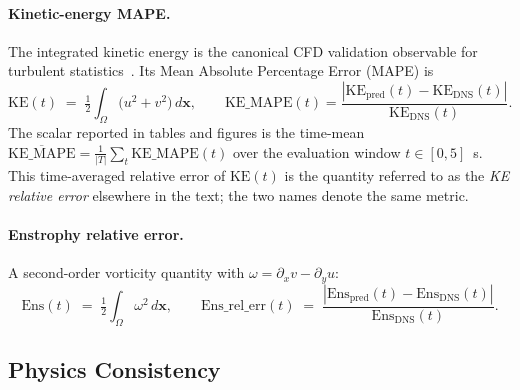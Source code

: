 \paragraph{Kinetic-energy MAPE.}
The integrated kinetic energy is the canonical CFD validation observable for turbulent statistics~\cite{Pope2000}. Its Mean Absolute Percentage Error (MAPE) is
\begin{equation}
    \mathrm{KE}(t) \;=\; \tfrac{1}{2}\int_\Omega \big(u^2 + v^2\big)\,d\mathbf{x},\qquad
    \mathrm{KE\_MAPE}(t) = \frac{|\mathrm{KE}_{\text{pred}}(t) - \mathrm{KE}_{\text{DNS}}(t)|}{\mathrm{KE}_{\text{DNS}}(t)}.
\end{equation}
The scalar reported in tables and figures is the time-mean $\overline{\mathrm{KE\_MAPE}} = \tfrac{1}{|T|}\sum_t \mathrm{KE\_MAPE}(t)$ over the evaluation window $t\in[0,5]$~s. This time-averaged relative error of $\mathrm{KE}(t)$ is the quantity referred to as the \emph{KE relative error} elsewhere in the text; the two names denote the same metric.

\paragraph{Enstrophy relative error.}
A second-order vorticity quantity with $\omega = \partial_x v - \partial_y u$:
\begin{equation}
    \mathrm{Ens}(t) \;=\; \tfrac{1}{2}\int_\Omega \omega^2\,d\mathbf{x},\qquad
    \mathrm{Ens\_rel\_err}(t) \;=\; \frac{|\mathrm{Ens}_{\text{pred}}(t) - \mathrm{Ens}_{\text{DNS}}(t)|}{\mathrm{Ens}_{\text{DNS}}(t)}.
\end{equation}

\subsection{Physics Consistency}

